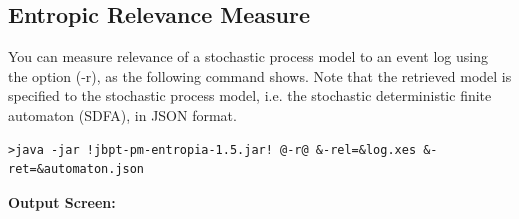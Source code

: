 \documentclass{article}
\begin{document}
\subsection{Entropic Relevance Measure}
You can measure relevance of a stochastic process model to an event log using the option (\textcolor{darkcandyapplered}{\footnotesize\ttfamily-r}), as the following command shows. Note that the retrieved model is specified to the stochastic process model, i.e. the stochastic deterministic finite automaton (SDFA), in JSON format.

\begin{lstlisting}[style=CL]
>java -jar !jbpt-pm-entropia-1.5.jar! @-r@ &-rel=&log.xes &-ret=&automaton.json
\end{lstlisting}
\textbf{Output Screen:}%



\newpage


\end{document}

